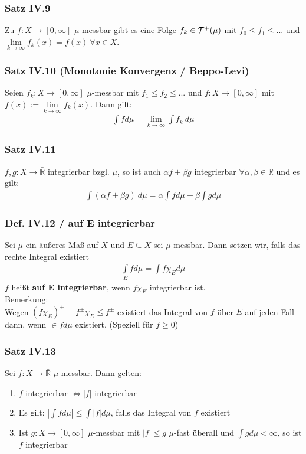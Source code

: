 \begin{frame}
\frametitle{Satz IV.9}
Zu $f: X \to [0,\infty]$ $\mu$-messbar gibt es eine Folge $f_k \in \mathcal{T}^+(\mu)$ mit $f_0 \leq f_1 \leq ...$ und $\lim\limits_{k \to \infty} f_k(x) = f(x) \ \forall x \in X$.
\end{frame}


\begin{frame}
\frametitle{Satz IV.10 (Monotonie Konvergenz / Beppo-Levi)}
Seien $f_k:X \to [0,\infty]$ $\mu$-messbar mit $f_1 \leq f_2 \leq ...$ und $f: X \to [0, \infty]$ mit $f(x) := \lim\limits_{k \to \infty} f_k(x)$. Dann gilt:
    \begin{align*}
      \int f d\mu = \lim\limits_{k \to \infty} \int f_k \ d\mu
    \end{align*}
\end{frame}


\begin{frame}
\frametitle{Satz IV.11}
$f,g: X \to \bar{\mathbb{R}}$ integrierbar bzgl. $\mu$, so ist auch $\alpha f + \beta g$ integrierbar $\forall \alpha, \beta \in \mathbb{R}$ und es gilt:
    \begin{align*}
      \int (\alpha f + \beta g) \ d\mu = \alpha \int f d\mu + \beta \int g d\mu
    \end{align*}
\end{frame}


\begin{frame}
\frametitle{Def. IV.12 / auf E integrierbar}
Sei $\mu$ ein äußeres Maß auf $X$ und $E \subseteq X$ sei $\mu$-messbar. Dann setzen wir, falls das rechte Integral existiert
    \begin{align*}
      \int\limits_E f d\mu = \int f \chi_E d\mu
    \end{align*}
    $f$ heißt \textbf{auf $\bm{E}$ integrierbar}, wenn $f \chi_E$ integrierbar ist.\\
\medskip
Bemerkung:\\
Wegen $(f \chi_E)^{\pm} = f^{\pm} \chi_E \leq f^{\pm}$ existiert das Integral von $f$ über $E$ auf jeden Fall dann, wenn $\in f d\mu$ existiert. (Speziell für $f \geq 0$)
\end{frame}


\begin{frame}
\frametitle{Satz IV.13}
Sei $f: X \to \bar{\mathbb{R}}$ $\mu$-messbar. Dann gelten:
    \begin{enumerate}[label=\roman*)]
      \item $f$ integrierbar $\Leftrightarrow |f|$ integrierbar
      \item Es gilt: $|\int f d\mu| \leq \int |f| d\mu$, falls das Integral von $f$ existiert
      \item Ist $g: X \to [0, \infty]$ $\mu$-messbar mit $|f| \leq g$ $\mu$-fast überall und $\int g d\mu < \infty$, so ist $f$ integrierbar 
    \end{enumerate}
\end{frame}
